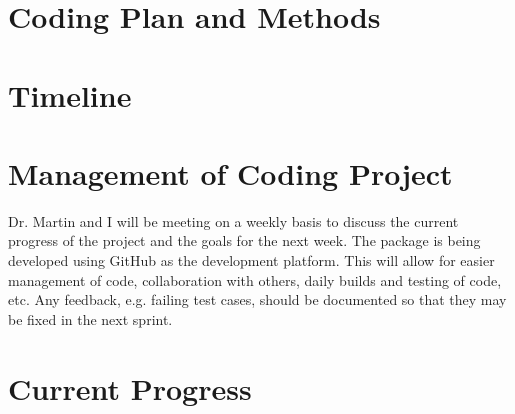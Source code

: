 \documentclass[english]{article}\usepackage[]{graphicx}\usepackage[]{color}
\begin{document}
\subsection*{}



\section*{Coding Plan and Methods}

\section*{Timeline}

\section*{Management of Coding Project}
Dr. Martin and I will be meeting on a weekly basis to discuss the current progress of the project and the goals for the next week. The package is being developed using GitHub as the development platform. This will allow for easier management of code, collaboration with others, daily builds and testing of code, etc. Any feedback, e.g. failing test cases, should be documented so that they may be fixed in the next sprint.

\section*{Current Progress}
\end{document}
